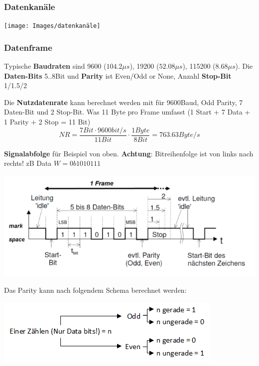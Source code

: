 \subsubsection{Datenkanäle}
\begin{center}
	\texttt{[image: Images/datenkanäle]}
\end{center}

\subsubsection{Datenframe}
Typische \textbf{Baudraten} sind 9600 ($104.2\mu s$), 19200 ($52.08\mu s$), 115200 ($8.68\mu s$). Die \textbf{Daten-Bits} 5..8Bit und \textbf{Parity} ist Even/Odd or None, Anzahl \textbf{Stop-Bit} 1/1.5/2

\noindent Die \textbf{Nutzdatenrate} kann berechnet werden mit für 9600Baud, Odd Parity, 7 Daten-Bit und 2 Stop-Bit. Was 11 Byte pro Frame umfasst (1 Start + 7 Data + 1 Parity + 2 Stop = 11 Bit)
\[
NR = \frac{7Bit \cdot 9600bit/s}{11 Bit}\cdot \frac{1Byte}{8Bit} = 763.63Byte/s
\]

\noindent \textbf{Signalabfolge} für Beispiel von oben. \textbf{Achtung}: Bitreihenfolge ist von links nach rechts! zB Data $W = 0b1010111$
\begin{center}
	\includegraphics[width=\columnwidth]{Images/datenframe}
\end{center}
Das Parity kann nach folgendem Schema berechnet werden:\\
\begin{center}
	\includegraphics[width=0.8\columnwidth]{Images/parity}
\end{center}

